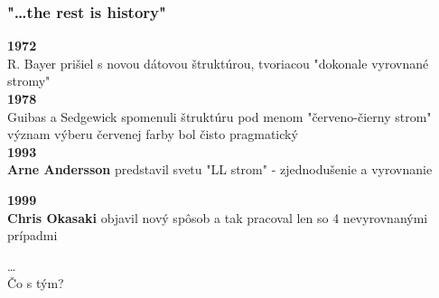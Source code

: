 \documentclass{beamer}
\begin{document}
    \begin{frame}
        \frametitle{"\ldots the rest is history"}

        \textbf{1972}
        \\ {\footnotesize{R. Bayer prišiel s novou dátovou štruktúrou, tvoriacou "dokonale vyrovnané stromy"}} \\

        \vspace{10pt}
        \textbf{1978}
        \\ {\footnotesize{Guibas a Sedgewick spomenuli štruktúru pod menom "červeno-čierny strom" \\
        význam výberu červenej farby bol čisto pragmatický}} \\

        \vspace{10pt}
        \textbf{1993}
        \\ {\footnotesize{\textbf{Arne Andersson} predstavil svetu "LL strom" - zjednodušenie a vyrovnanie}}

        \vspace{10pt}
        \textbf{1999}
        \\ {\footnotesize{\textbf{Chris Okasaki} objavil nový spôsob a tak pracoval len so 4 nevyrovnanými prípadmi}}



        \begin{center}
            \ldots \\
            Čo s tým?
        \end{center}
    \end{frame}
\end{document}
